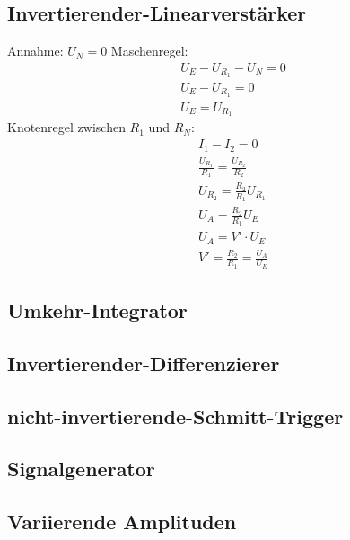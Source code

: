     \subsection{Invertierender-Linearverstärker}
        Annahme: $U_N = 0$
        Maschenregel:
        \begin{align}
            U_E -U_{R_1}-U_N = 0\\
            U_E -U_{R_1} = 0\\
            U_E = U_{R_1}
        \end{align}
        Knotenregel zwischen $R_1$ und $R_N$:
        \begin{align}
            I_1-I_2 = 0\\
            \frac{U_{R_1}}{R_1} = \frac{U_{R_2}}{R_2}\\
            U_{R_2} = \frac{R_2}{R_1} U_{R_1}\\
            U_{A} = \frac{R_2}{R_1} U_{E}\\
            U_{A} = V' \cdot U_{E}\\
            V' =  \frac{R_2}{R_1} =\frac{U_A}{U_E}
        \end{align}
        
    \subsection{Umkehr-Integrator}
    \subsection{Invertierender-Differenzierer}
    \subsection{nicht-invertierende-Schmitt-Trigger}
    \subsection{Signalgenerator}
    \subsection{Variierende Amplituden}